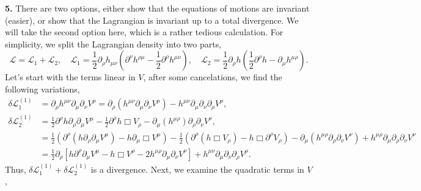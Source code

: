 \textbf{5.} There are two options, either show that the equations of motions are invariant (easier), or show that the Lagrangian is invariant up to a total divergence. We will take the second option here, which is a rather tedious calculation. For simplicity, we split the Lagrangian density into two parts,
\begin{equation}
    \mathcal{L} = \mathcal{L}_1 + \mathcal{L}_2, \quad \mathcal{L}_1 = \frac{1}{2}\partial_\rho h_{\mu\nu} \left( \partial^\nu h^{\rho\mu} - \frac{1}{2}\partial^\rho h^{\mu\nu} \right), \quad \mathcal{L}_2 = \frac{1}{2}\partial_\rho h \left( \frac{1}{2}\partial^\rho h - \partial_\mu h^{\mu\rho} \right).
\end{equation}
Let's start with the terms linear in $V$, after some cancelations, we find the following variations,
\begin{equation}
\begin{aligned}
    \delta\mathcal{L}_1^{(1)} &= \partial_\rho h^{\mu\nu}\partial_\mu\partial_\nu V^\rho = \partial_\rho(h^{\mu\nu}\partial_\mu\partial_\nu V^\rho) - h^{\mu\nu}\partial_\mu\partial_\nu\partial_\rho V^\rho, \\
    \delta\mathcal{L}_2^{(1)} &= \frac{1}{2}\partial^\rho h \partial_\rho\partial_\mu V^\mu - \frac{1}{2}\partial^\rho h \Box V_\rho - \partial_\mu(h^{\mu\rho})\partial_\rho\partial_\nu V^\nu, \\
    &= \frac{1}{2}\left( \partial^\rho(h\partial_\rho\partial_\mu V^\mu) - h\partial_\mu\Box V^\mu \right) - \frac{1}{2}\left( \partial^\rho(h\Box V_\rho) - h\Box\partial^\rho V_\rho \right) - \partial_\mu(h^{\mu\rho}\partial_\rho\partial_\nu V^\nu) + h^{\mu\rho}\partial_\mu\partial_\rho\partial_\nu V^\nu \\
    &= \frac{1}{2}\partial_\rho \left[ h\partial^\rho\partial_\mu V^\mu - h\Box V^\rho - 2h^{\mu\rho}\partial_\mu\partial_\nu V^\nu \right] + h^{\mu\nu}\partial_\mu\partial_\nu\partial_\rho V^\rho.
\end{aligned}
\end{equation}
Thus, $\delta\mathcal{L}_1^{(1)} + \delta\mathcal{L}_2^{(1)}$ is a divergence. Next, we examine the quadratic terms in $V$,
